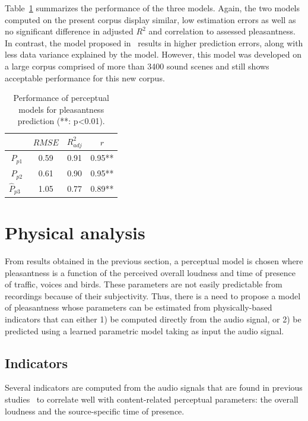 \documentclass[11pt,a4paper]{article}
\begin{document}
Table~\ref{tab:percm} summarizes the performance of the three models. Again, the two models computed on the present corpus display similar, low estimation errors as well as no significant difference in adjusted $R^2$ and correlation to assessed pleasantness. In contrast, the model proposed in~\cite{ricciardi2014} results in higher prediction errors, along with less data variance explained by the model. However, this model was developed on a large corpus comprised of more than 3400 sound scenes and still shows acceptable performance for this new corpus.

\begin{table}[t]
\centering
\caption{Performance of perceptual models for pleasantness prediction (**: p<0.01).}
\label{tab:percm}
\begin{tabular}{ c | c | c | c }
\hline
	 & $RMSE$ & $R^2_{adj}$ & $r$ \\ \hline
	$\hat P_{p1}$ & 0.59 & 0.91 & 0.95** \\
	$\hat P_{p2}$ & 0.61 & 0.90 & 0.95** \\
	$\hat P_{p3}$~\cite{ricciardi2014} & 1.05 & 0.77 & 0.89** \\ \hline
\end{tabular}
\end{table}

\section{Physical analysis}

From results obtained in the previous section, a perceptual model is chosen where pleasantness is a function of the perceived overall loudness and time of presence of traffic, voices and birds. These parameters are not easily predictable from recordings because of their subjectivity. Thus, there is a need to propose a model of pleasantness whose parameters can be estimated from physically-based indicators that can either 1) be computed directly from the audio signal, or 2) be predicted using a learned parametric model taking as input the audio signal.

\subsection{Indicators}

Several indicators are computed from the audio signals that are found in previous studies~\cite{aumond, gontier, lavandier} to correlate well with content-related perceptual parameters: the overall loudness and the source-specific time of presence.\\
\end{document}
